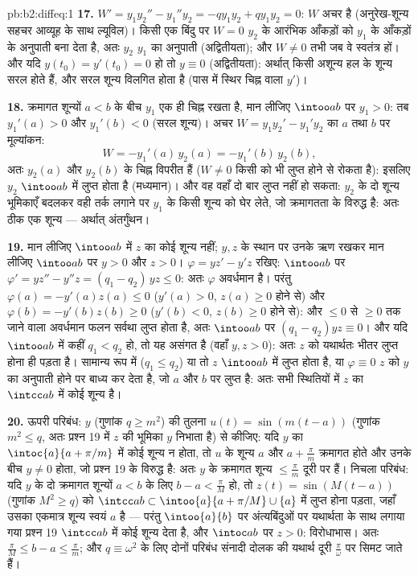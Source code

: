 \begin{solution}{pb:b2:diffeq:1}
\textbf{17.} $W' = y_1y_2'' - y_1''y_2 = -qy_1y_2 + qy_1y_2 =
0$: $W$ अचर है (अनुरेख-शून्य सहचर आव्यूह के साथ ल्यूविल)।
किसी एक बिंदु पर $W = 0$ $y_2$ के आरंभिक आँकड़ों को $y_1$ के आँकड़ों के अनुपाती
बना देता है, अतः $y_2$ $y_1$ का अनुपाती (अद्वितीयता); और $W \neq 0$ तभी जब वे
स्वतंत्र हों। और यदि $y(t_0) =
y'(t_0) = 0$ हो तो $y \equiv 0$ (अद्वितीयता): अर्थात् किसी अशून्य हल के
शून्य सरल होते हैं, और सरल शून्य विलगित होता है (पास में स्थिर चिह्न वाला
$y'$)।

\textbf{18.} क्रमागत शून्यों $a < b$ के बीच $y_1$ एक ही चिह्न रखता है, मान
लीजिए $\intoo ab$ पर $y_1 > 0$: तब $y_1'(a) > 0$ और $y_1'(b) < 0$ (सरल शून्य)। अचर $W =
y_1y_2' - y_1'y_2$ का $a$ तथा $b$ पर
मूल्यांकन:
\[
W = -y_1'(a)\,y_2(a) = -y_1'(b)\,y_2(b) ,
\]
अतः $y_2(a)$ और $y_2(b)$ के चिह्न विपरीत हैं ($W \neq 0$ किसी को भी लुप्त होने से रोकता
है): इसलिए $y_2$ $\intoo ab$ में लुप्त होता है (मध्यमान)। और वह वहाँ दो बार लुप्त
नहीं हो सकता: $y_2$ के दो शून्य भूमिकाएँ बदलकर वही तर्क लगाने पर $y_1$ के
किसी शून्य को घेर लेते, जो क्रमागतता के विरुद्ध है: अतः ठीक एक शून्य ---
अर्थात् अंतर्गुंथन।

\textbf{19.} मान लीजिए $\intoo ab$ में $z$ का कोई शून्य नहीं; $y, z$ के स्थान पर
उनके ऋण रखकर मान लीजिए $\intoo ab$ पर $y > 0$ और $z > 0$। $\varphi = yz' - y'z$ रखिए: $\intoo ab$ पर $\varphi' = yz'' -
y''z = (q_1 - q_2)\,yz \leq 0$: अतः $\varphi$
अवर्धमान है। परंतु $\varphi(a) = -y'(a)z(a) \leq 0$ ($y'(a) > 0$, $z(a) \geq 0$ होने से) और $\varphi(b) = -y'(b)z(b) \geq
0$ ($y'(b) < 0$, $z(b) \geq 0$ होने
से): और $\leq 0$ से $\geq 0$ तक जाने वाला अवर्धमान फलन सर्वथा लुप्त होता है, अतः
$\intoo ab$ पर $(q_1 - q_2)yz \equiv 0$। और यदि $\intoo ab$ में कहीं $q_1 < q_2$ हो, तो यह असंगत है (वहाँ $y, z > 0$):
अतः $z$ को यथार्थतः भीतर लुप्त होना ही पड़ता है। सामान्य रूप में ($q_1 \leq q_2$)
या तो $z$ $\intoo ab$ में लुप्त होता है, या $\varphi \equiv 0$ $z$ को $y$ का अनुपाती होने पर
बाध्य कर देता है, जो $a$ और $b$ पर लुप्त है: अतः सभी स्थितियों में $z$
का $\intcc ab$ में कोई शून्य है।

\textbf{20.} ऊपरी परिबंध: $y$ (गुणांक $q \geq
m^2$) की तुलना $u(t) = \sin(m(t - a))$ (गुणांक $m^2 \leq q$, अतः
प्रश्न 19 में $z$ की भूमिका $y$ निभाता है) से कीजिए: यदि $y$ का $\intoc{a}{a + \pi/m}$ में
कोई शून्य न होता, तो $u$ के शून्य $a$ और $a +
\frac\pi m$ क्रमागत होते और उनके बीच
$y \neq 0$ होता, जो प्रश्न 19 के विरुद्ध है: अतः $y$ के क्रमागत शून्य $\leq \frac\pi m$ दूरी
पर हैं। निचला परिबंध: यदि $y$ के दो क्रमागत शून्यों $a < b$ के लिए $b - a < \frac\pi M$ हो,
तो $z(t) = \sin(M(t-a))$ (गुणांक $M^2 \geq q$) को $\intcc ab \subset \intoo{a}{a + \pi/M}
\cup\{a\}$ में लुप्त होना पड़ता, जहाँ उसका एकमात्र शून्य
स्वयं $a$ है --- परंतु $\intoo{a}{b}$ पर अंत्यबिंदुओं पर यथार्थता के साथ लगाया गया
प्रश्न 19 $\intcc ab$ में कोई शून्य देता है, और $\intoc ab$ पर $z > 0$: विरोधाभास। अतः $\frac\pi M \leq b - a \leq
\frac\pi m$;
और $q \equiv \omega^2$ के लिए दोनों परिबंध संनादी दोलक की यथार्थ दूरी $\frac\pi\omega$ पर सिमट जाते
हैं।


\end{solution}
